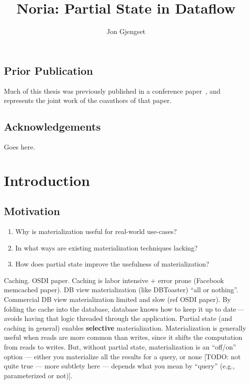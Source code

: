 \documentclass[fontsize=12pt,paper=letter,draft=true]{scrbook}
\title{Noria: Partial State in Dataflow}
\author{Jon Gjengset}
\let\mainmatterorig\mainmatter
\renewcommand\mainmatter
 {\edef\p{\arabic{page}}%
  \mainmatterorig
  \setcounter{page}{\p+1+(\p-\p/2*2)}%
 }
\begin{document}
\frontmatter



\leavevmode\thispagestyle{empty}\newpage %


\leavevmode\thispagestyle{empty}\newpage %

\section*{Prior Publication}
Much of this thesis was previously published in a conference paper~\cite{noria},
and represents the joint work of the coauthors of that paper.
\newpage

\section*{Acknowledgements}
\begin{spacing}{1}
  Goes here.
\end{spacing}

\tableofcontents

\mainmatter

\chapter{Introduction}

\section{Motivation}

\begin{enumerate}
 \item Why is materialization useful for real-world use-cases?
 \item In what ways are existing materialization techniques lacking?
 \item How does partial state improve the usefulness of materialization?
\end{enumerate}

Caching.
OSDI paper.
Caching is labor intensive + error prone (Facebook memcached paper).
DB view materialization (like DBToaster) ``all or nothing''.
Commercial DB view materialization limited and slow (ref OSDI paper).
By folding the cache into the database, database knows how to keep it up
to date\,---\,avoids having that logic threaded through the application.
Partial state (and caching in general) enables \textbf{selective} materialization.
Materialization is generally useful when reads are more common than
writes, since it shifts the computation from reads to writes.
But, without partial state, materialization is an ``off/on'' option —
either you materialize all the results for a query, or none [TODO: not
quite true — more subtlety here — depends what you mean by ``query''
(e.g., parameterized or not)].
\end{document}
